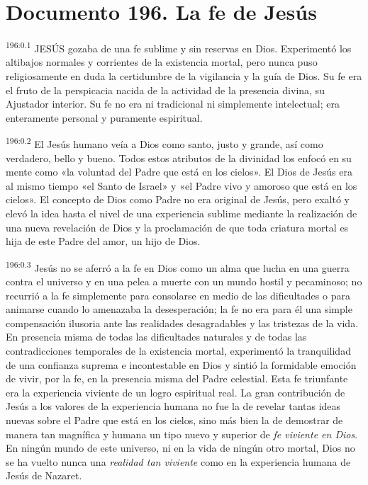 \chapter{Documento 196. La fe de Jesús}
\par 
\textsuperscript{196:0.1} JESÚS gozaba de una fe sublime y sin reservas en Dios. Experimentó los altibajos normales y corrientes de la existencia mortal, pero nunca puso religiosamente en duda la certidumbre de la vigilancia y la guía de Dios. Su fe era el fruto de la perspicacia nacida de la actividad de la presencia divina, su Ajustador interior. Su fe no era ni tradicional ni simplemente intelectual; era enteramente personal y puramente espiritual.

\par 
\textsuperscript{196:0.2} El Jesús humano veía a Dios como santo, justo y grande, así como verdadero, bello y bueno. Todos estos atributos de la divinidad los enfocó en su mente como «la voluntad del Padre que está en los cielos». El Dios de Jesús era al mismo tiempo «el Santo de Israel» y «el Padre vivo y amoroso que está en los cielos». El concepto de Dios como Padre no era original de Jesús, pero exaltó y elevó la idea hasta el nivel de una experiencia sublime mediante la realización de una nueva revelación de Dios y la proclamación de que toda criatura mortal es hija de este Padre del amor, un hijo de Dios.

\par 
\textsuperscript{196:0.3} Jesús no se aferró a la fe en Dios como un alma que lucha en una guerra contra el universo y en una pelea a muerte con un mundo hostil y pecaminoso; no recurrió a la fe simplemente para consolarse en medio de las dificultades o para animarse cuando lo amenazaba la desesperación; la fe no era para él una simple compensación ilusoria ante las realidades desagradables y las tristezas de la vida. En presencia misma de todas las dificultades naturales y de todas las contradicciones temporales de la existencia mortal, experimentó la tranquilidad de una confianza suprema e incontestable en Dios y sintió la formidable emoción de vivir, por la fe, en la presencia misma del Padre celestial. Esta fe triunfante era la experiencia viviente de un logro espiritual real. La gran contribución de Jesús a los valores de la experiencia humana no fue la de revelar tantas ideas nuevas sobre el Padre que está en los cielos, sino más bien la de demostrar de manera tan magnífica y humana un tipo nuevo y superior de \textit{fe viviente en Dios}. En ningún mundo de este universo, ni en la vida de ningún otro mortal, Dios no se ha vuelto nunca una \textit{realidad tan viviente} como en la experiencia humana de Jesús de Nazaret.

